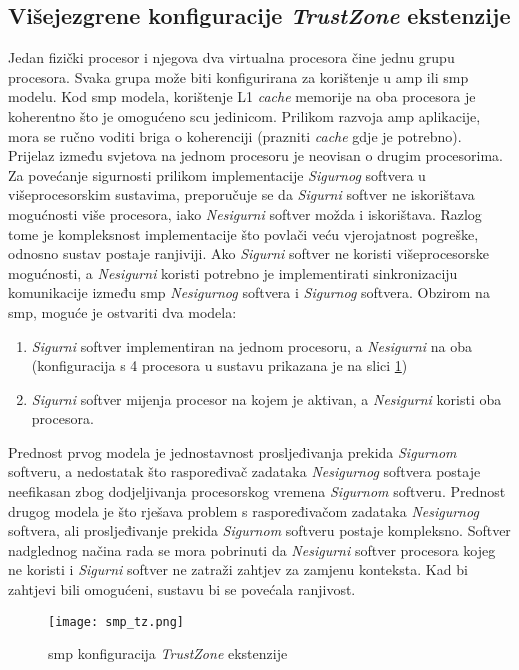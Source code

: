 \documentclass[times, utf8, diplomski, numeric]{fer}
\begin{document}
\subsection{Višejezgrene konfiguracije \textit{TrustZone} ekstenzije}
Jedan fizički procesor i njegova dva virtualna procesora čine jednu grupu procesora. Svaka grupa može biti konfigurirana za
korištenje u \gls{amp} ili \gls{smp} modelu. Kod \gls{smp} modela, korištenje L1 \textit{cache} memorije na oba procesora je koherentno što
je omogućeno \gls{scu} jedinicom. Prilikom razvoja \gls{amp} aplikacije, mora se ručno voditi briga o koherenciji (prazniti \textit{cache}
gdje je potrebno). Prijelaz između svjetova na jednom procesoru je neovisan o drugim procesorima. Za povećanje sigurnosti
prilikom implementacije \textit{Sigurnog} softvera u višeprocesorskim sustavima, preporučuje se da \textit{Sigurni} softver ne iskorištava
mogućnosti više procesora, iako \textit{Nesigurni} softver možda i iskorištava. Razlog tome je kompleksnost implementacije što povlači
veću vjerojatnost pogreške, odnosno sustav postaje ranjiviji. Ako \textit{Sigurni} softver ne koristi višeprocesorske mogućnosti,
a \textit{Nesigurni} koristi potrebno je implementirati sinkronizaciju komunikacije između \gls{smp} \textit{Nesigurnog} softvera i \textit{Sigurnog} softvera.
Obzirom na \gls{smp}, moguće je ostvariti dva modela:
\begin{enumerate}
  \item{\textit{Sigurni} softver implementiran na jednom procesoru, a \textit{Nesigurni} na oba (konfiguracija s 4 procesora u sustavu prikazana
  je na slici \ref{smp_tz})}
  \item{\textit{Sigurni} softver mijenja procesor na kojem je aktivan, a \textit{Nesigurni} koristi oba procesora.}
\end{enumerate}
Prednost prvog modela je jednostavnost prosljeđivanja prekida \textit{Sigurnom} softveru, a nedostatak što raspoređivač zadataka
\textit{Nesigurnog} softvera postaje neefikasan zbog dodjeljivanja procesorskog vremena \textit{Sigurnom} softveru. Prednost drugog modela je
što rješava problem s raspoređivačom zadataka \textit{Nesigurnog} softvera, ali prosljeđivanje prekida \textit{Sigurnom} softveru postaje
kompleksno. Softver nadglednog načina rada se mora pobrinuti da \textit{Nesigurni} softver procesora kojeg ne koristi i \textit{Sigurni} softver
ne zatraži zahtjev za zamjenu konteksta. Kad bi zahtjevi bili omogućeni, sustavu bi se povećala ranjivost.
\begin{figure}[H]
  \centering
	\texttt{[image: smp\_tz.png]}%
	\caption{\gls{smp} konfiguracija \textit{TrustZone} ekstenzije \cite{tz_wp}}
	\label{smp_tz}%
\end{figure}
\end{document}
